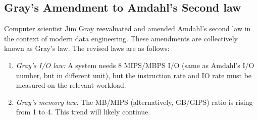 \documentclass[journal]{IEEEtran}
\begin{document}
\subsection{Gray's Amendment to Amdahl's Second law}
Computer scientist Jim Gray reevaluated and amended Amdahl's second law in the context of modern data engineering. These amendments are collectively known as Gray's law. The revised laws are as follows:
\begin{enumerate}
\item \textit{Gray's I/O law:} A system needs 8 MIPS/MBPS I/O (same as Amdahl's I/O number, but in different unit), but the instruction rate and IO rate must be measured on the relevant workload.
\item \textit{Gray's memory law:} The MB/MIPS (alternatively, GB/GIPS) ratio is rising from 1 to 4. This trend will likely continue.
\end{enumerate}
\end{document}

